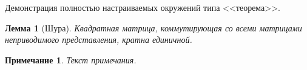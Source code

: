 Демонстрация полностью настраиваемых окружений типа <<теорема>>.

\newtheorem{lemm}{Лемма}[chapter]

\def\thelemmstyle{\bfseries}
\def\oparglemmstyle{\slshape}
\def\lemmstyle{}
\def\preoparglemm{(}
\def\postoparglemm{)}

\newtheorem{remark}{Примечание}[chapter]

\def\remarkstyle{\itshape}
\def\theremarkstyle{}
\def\posttheremark{:}

\begin{lemm}[Шура]
Квадратная матрица, коммутирующая со всеми матрицами неприводимого представления, кратна единичной.
\end{lemm}

\begin{remark}
Текст примечания.
\end{remark}
